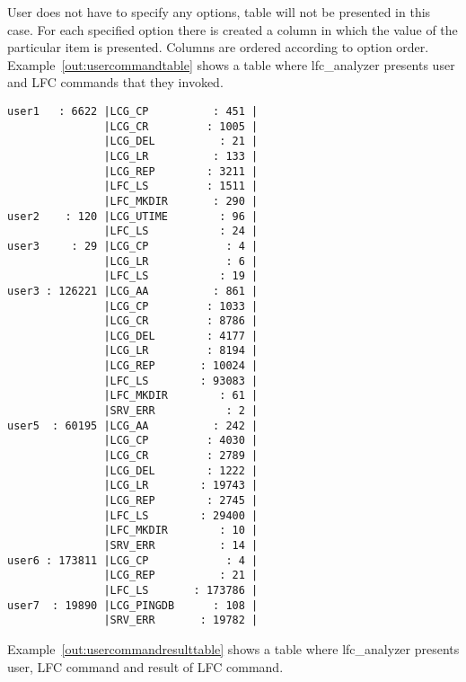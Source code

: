 \documentclass[a4paper, 11pt]{article} %
\begin{document}
User does not have to specify any options, table will not be presented in this case. For each specified option there is created a column in which the value of the particular item is presented. Columns are ordered according to option order. Example~\ref{out:usercommandtable} shows a table where lfc\_analyzer presents user and LFC commands that they invoked.

\newpage

\begin{center}
\begin{lstlisting}[style=cli, label={out:usercommandtable}, caption={lfc\_analyzer -i logfile -u -c}]
user1   : 6622 |LCG_CP          : 451 |
               |LCG_CR         : 1005 |
               |LCG_DEL          : 21 |
               |LCG_LR          : 133 |
               |LCG_REP        : 3211 |
               |LFC_LS         : 1511 |
               |LFC_MKDIR       : 290 |
user2    : 120 |LCG_UTIME        : 96 |
               |LFC_LS           : 24 |
user3     : 29 |LCG_CP            : 4 |
               |LCG_LR            : 6 |
               |LFC_LS           : 19 |
user3 : 126221 |LCG_AA          : 861 |
               |LCG_CP         : 1033 |
               |LCG_CR         : 8786 |
               |LCG_DEL        : 4177 |
               |LCG_LR         : 8194 |
               |LCG_REP       : 10024 |
               |LFC_LS        : 93083 |
               |LFC_MKDIR        : 61 |
               |SRV_ERR           : 2 |
user5  : 60195 |LCG_AA          : 242 |
               |LCG_CP         : 4030 |
               |LCG_CR         : 2789 |
               |LCG_DEL        : 1222 |
               |LCG_LR        : 19743 |
               |LCG_REP        : 2745 |
               |LFC_LS        : 29400 |
               |LFC_MKDIR        : 10 |
               |SRV_ERR          : 14 |
user6 : 173811 |LCG_CP            : 4 |
               |LCG_REP          : 21 |
               |LFC_LS       : 173786 |
user7  : 19890 |LCG_PINGDB      : 108 |
               |SRV_ERR       : 19782 |
\end{lstlisting}
\end{center}

\newpage

Example~\ref{out:usercommandresulttable} shows a table where lfc\_analyzer presents user, LFC command and result of LFC command.
\end{document}
